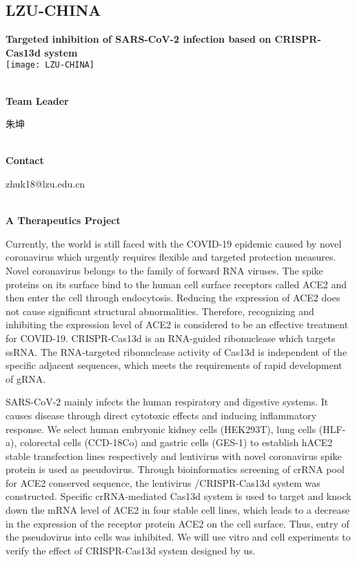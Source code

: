 \subsection{\textcolor{Blu}{ LZU-CHINA } }
\vspace{5mm}
\begin{center}
\large{
  \textbf{ Targeted inhibition of SARS-CoV-2 infection based on CRISPR-Cas13d system }\\
  \texttt{[image: LZU-CHINA]}
}
\end{center}
\textbf{\\Team Leader}

  朱坤


\textbf{\\Contact}

  zhuk18@lzu.edu.cn


\textbf{\\A Therapeutics Project\\}\begin{spacing}{1.5}

Currently, the world is still faced with the COVID-19 epidemic caused by novel coronavirus which urgently requires flexible and targeted protection measures. Novel coronavirus belongs to the family of forward RNA viruses. The spike proteins on its surface bind to the human cell surface receptors called ACE2 and then enter the cell through endocytosis. Reducing the expression of ACE2 does not cause significant structural abnormalities. Therefore, recognizing and inhibiting the expression level of ACE2 is considered to be an effective treatment for COVID-19. CRISPR-Cas13d is an RNA-guided ribonuclease which targets ssRNA. The RNA-targeted ribonuclease activity of Cas13d is independent of the specific adjacent sequences, which meets the requirements of rapid development of gRNA.

SARS-CoV-2 mainly infects the human respiratory and digestive systems. It causes disease through direct cytotoxic effects and inducing inflammatory response. We select human embryonic kidney cells (HEK293T), lung cells (HLF-a), colorectal cells (CCD-18Co) and gastric cells (GES-1) to establish hACE2 stable transfection lines respectively and lentivirus with novel coronavirus spike protein is used as pseudovirus. Through bioinformatics screening of crRNA pool for ACE2 conserved sequence, the lentivirus /CRISPR-Cas13d system was constructed. Specific crRNA-mediated Cas13d system is used to target and knock down the mRNA level of ACE2 in four stable cell lines, which leads to a decrease in the expression of the receptor protein ACE2 on the cell surface. Thus, entry of the pseudovirus into cells was inhibited. We will use vitro and cell experiments to verify the effect of CRISPR-Cas13d system designed by us.\end{spacing}
\\

